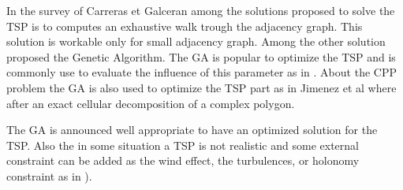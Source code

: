 	In the survey of Carreras et Galceran \citep{66*galceran2013} among the solutions proposed to solve the TSP is to computes an exhaustive walk trough the adjacency graph. This solution is workable only for small adjacency graph. Among the other solution proposed the Genetic Algorithm. The GA is popular to optimize the TSP and is commonly use to evaluate the influence of this parameter as in \citep{68*muhlenbein1989} \citep{80*serpell2010}. About the CPP problem the GA is also used to optimize the TSP part as in Jimenez et al \citep{217*jimenez2007}  where after an exact cellular decomposition of a complex polygon. 
	
The GA is announced well appropriate to have an optimized solution for the TSP. 
Also the in some situation a  TSP is not realistic and some external constraint can be added as the wind effect, the turbulences, or holonomy constraint as in \citep{56*davies2006,102*ware2016,66*galceran2013}).
 
 


 



